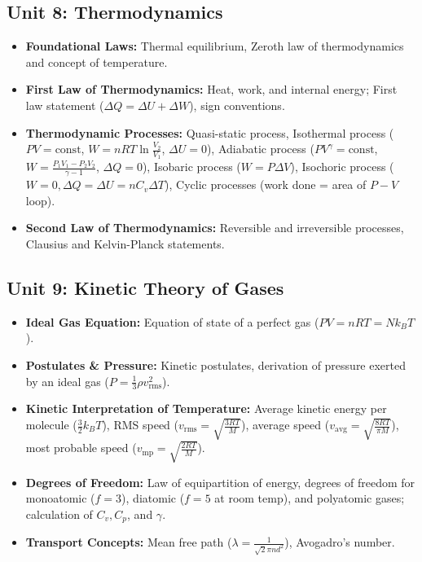 \documentclass[11pt,a4paper]{article}
\begin{document}
\subsection{Unit 8: Thermodynamics}
\begin{itemize}
  \item \textbf{Foundational Laws:} Thermal equilibrium, Zeroth law of thermodynamics and concept of temperature.
  \item \textbf{First Law of Thermodynamics:} Heat, work, and internal energy; First law statement ($\Delta Q = \Delta U + \Delta W$), sign conventions.
  \item \textbf{Thermodynamic Processes:} Quasi-static process, Isothermal process ($PV=\text{const}$, $W = nRT\ln\frac{V_2}{V_1}$, $\Delta U=0$), Adiabatic process ($PV^\gamma=\text{const}$, $W = \frac{P_1V_1-P_2V_2}{\gamma-1}$, $\Delta Q=0$), Isobaric process ($W = P\Delta V$), Isochoric process ($W=0, \Delta Q = \Delta U = nC_v\Delta T$), Cyclic processes (work done = area of $P-V$ loop).
  \item \textbf{Second Law of Thermodynamics:} Reversible and irreversible processes, Clausius and Kelvin-Planck statements.
\end{itemize}

\subsection{Unit 9: Kinetic Theory of Gases}
\begin{itemize}
  \item \textbf{Ideal Gas Equation:} Equation of state of a perfect gas ($PV = nRT = Nk_B T$).
  \item \textbf{Postulates \& Pressure:} Kinetic postulates, derivation of pressure exerted by an ideal gas ($P = \frac{1}{3}\rho v_{\text{rms}}^2$).
  \item \textbf{Kinetic Interpretation of Temperature:} Average kinetic energy per molecule ($\frac{3}{2}k_B T$), RMS speed ($v_{\text{rms}} = \sqrt{\frac{3RT}{M}}$), average speed ($v_{\text{avg}} = \sqrt{\frac{8RT}{\pi M}}$), most probable speed ($v_{\text{mp}} = \sqrt{\frac{2RT}{M}}$).
  \item \textbf{Degrees of Freedom:} Law of equipartition of energy, degrees of freedom for monoatomic ($f=3$), diatomic ($f=5$ at room temp), and polyatomic gases; calculation of $C_v, C_p$, and $\gamma$.
  \item \textbf{Transport Concepts:} Mean free path ($\lambda = \frac{1}{\sqrt{2}\pi n d^2}$), Avogadro's number.
\end{itemize}
\end{document}
